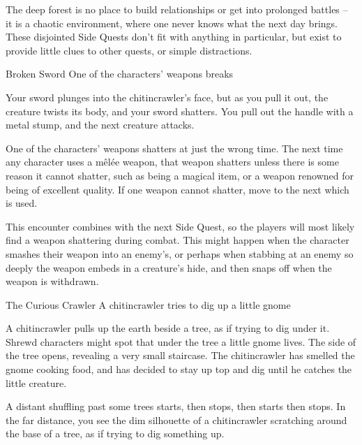 \begin{multicols}{2}
\stopcontents[sq]

\label{interruptions}

\startcontents[sq]

\sqminitoc

\noindent
The deep forest is no place to build relationships or get into prolonged battles -- it is a chaotic environment, where one never knows what the next day brings.
These disjointed Side Quests don't fit with anything in particular, but exist to provide little clues to other quests, or simple distractions.

{\squash Broken Sword}%
{One of the characters' weapons breaks}%

\begin{boxtext}

  Your sword plunges into the chitincrawler's face, but as you pull it out, the creature twists its body, and your sword shatters.
  You pull out the handle with a metal stump, and the next creature attacks.

\end{boxtext}

One of the characters' weapons shatters at just the wrong time.
The next time any character uses a m\^el\'ee weapon, that weapon shatters unless there is some reason it cannot shatter, such as being a magical item, or a weapon renowned for being of excellent quality.
If one weapon cannot shatter, move to the next which is used.

This encounter combines with the next Side Quest, so the players will most likely find a weapon shattering during combat.
This might happen when the character smashes their weapon into an enemy's, or perhaps when stabbing at an enemy so deeply the weapon embeds in a creature's hide, and then snaps off when the weapon is withdrawn.


{The Curious Crawler}%
{A chitincrawler tries to dig up a little gnome}%

A chitincrawler pulls up the earth beside a tree, as if trying to dig under it.
Shrewd characters might spot that under the tree a little gnome lives.
The side of the tree opens, revealing a very small staircase.
The chitincrawler has smelled the gnome cooking food, and has decided to stay up top and dig until he catches the little creature.

\begin{boxtext}

  A distant shuffling past some trees starts, then stops, then starts then stops.
  In the far distance, you see the dim silhouette of a chitincrawler scratching around the base of a tree, as if trying to dig something up.


\end{boxtext}
\end{multicols}

